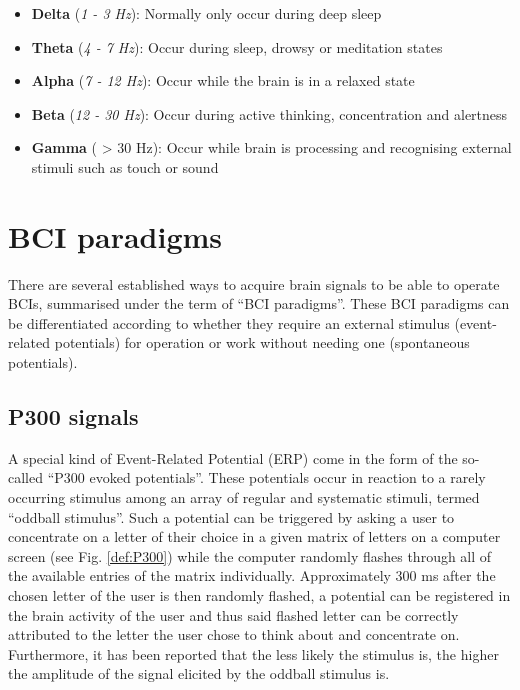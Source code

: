 \begin{itemize}
    \item \textbf{Delta} (\emph{1 - 3 Hz}): Normally only occur during deep sleep
    \item \textbf{Theta} (\emph{4 - 7 Hz}): Occur during sleep, drowsy or meditation states
    \item \textbf{Alpha} (\emph{7 - 12 Hz}): Occur while the brain is in a relaxed state
    \item \textbf{Beta} (\emph{12 - 30 Hz}): Occur during active thinking, concentration and alertness
    \item \textbf{Gamma} ( > 30 Hz): Occur while brain is processing and recognising external stimuli such as touch or sound
\end{itemize}

\section{BCI paradigms}
\label{sec:def:paradigm}

There are several established ways to acquire brain signals to be able to operate BCIs, summarised under the term of ``BCI paradigms''. These BCI paradigms can be differentiated according to whether they require an external stimulus (event-related potentials) for  operation or work without needing one (spontaneous potentials). 

\subsection{P300 signals}

A special %
kind of Event-Related Potential (ERP) come in the form of the so-called ``P300 evoked potentials''. These potentials occur in reaction to a rarely occurring stimulus among an array of regular and systematic stimuli, termed ``oddball stimulus''. %
Such a potential can be triggered by asking a user to concentrate on a letter of their choice in a given matrix of letters on a computer screen (see Fig. \ref{def:P300}) while the computer randomly flashes through all of the available entries of the matrix individually. Approximately 300 ms after the chosen letter of the user is then randomly flashed, a potential can be registered in the brain activity of the user and thus said flashed letter can be correctly attributed to the letter the user chose to think about and concentrate on. Furthermore, it has been reported that the less likely the stimulus is, the higher the amplitude of the signal elicited by the oddball stimulus is. %

